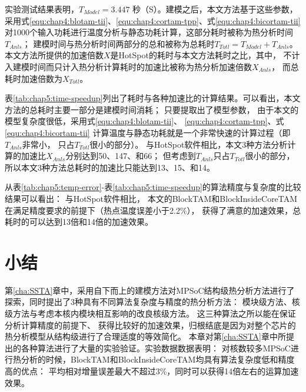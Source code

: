 实验测试结果表明，$T_{Model} = 3.447$ 秒（S）。建模之后，本文方法基于这些参数，采用式\ref{equ:chap4:blotam-tii}、\ref{equ:chap4:cortam-tpp}、式\ref{equ:chap4:bicortam-tii} 对1000个输入功耗进行温度分析与静态功耗计算，这部分耗时被称为热分析时间$T_{Anls}$； 建模时间与热分析时间两部分的总和被称为总耗时$T_{Totl}=T_{Model}+T_{Anls}$。 本文方法所提供的加速倍数$X$是HotSpot的耗时与本文方法耗时之比，其中， 不计入建模时间而只计入热分析计算耗时的加速比被称为热分析加速倍数$X_{Anls}$， 而总耗时加速倍数为$X_{Totl}$。

表\ref{tab:chap5:time-speedup}列出了耗时与各种加速比的计算结果。可以看出，本文方法的总耗时主要一部分是建模时间消耗； 只要提取出了模型参数， 由于本文的模型复杂度很低，采用式\ref{equ:chap4:blotam-tii}、 \ref{equ:chap4:cortam-tpp}、式\ref{equ:chap4:bicortam-tii} 计算温度与静态功耗就是一个非常快速的计算过程（即$T_{Anls}$非常小， 只占$T_{Totl}$很小的部分）。 与HotSpot软件相比，本文3种方法分析计算的加速比$X_{Anls}$分别达到50、147、和66； 但考虑到$T_{Anls}$只占$T_{Totl}$很小的部分，所以本文3种方法总耗时的加速比只能达到13、15、和14。

从表\ref{tab:chap5:temp-error}-表\ref{tab:chap5:time-speedup}的算法精度与复杂度的比较结果可以看出： 与HotSpot软件相比， 本文的BlockTAM和BlockInsideCoreTAM在满足精度要求的前提下（热点温度误差小于2.2\%）， 获得了满意的加速效果，总耗时的可以达到13倍和14倍的加速效果。

\section{小结}
第\ref{cha:SSTA}章中，采用自下而上的建模方法对MPSoC结构级热分析方法进行了探索，同时提出了3种具有不同算法复杂度与精度的热分析方法： 模块级方法、核级方法与考虑本核内模块相互影响的改良核级方法。 这三种算法之所以能在保证分析计算精度的前提下、 获得比较好的加速效果，归根结底是因为对整个芯片的热分析模型从结构级进行了合理适度的等效简化。
本章对第\ref{cha:SSTA}章中所提出的各种算法进行了大量的实验验证。实验数据数据表明： 对核数较多MPSoC进行热分析的时候，BlockTAM和BlockInsideCoreTAM均具有算法复杂度低和精度高的优点： 平均相对增量误差最大不超过3\%，同时可以获得14倍左右的运算加速效果。 